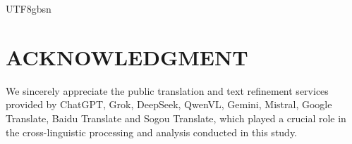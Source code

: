 \documentclass[conference]{IEEEtran}
\begin{document}
\begin{CJK*}{UTF8}{gbsn}




\section*{ACKNOWLEDGMENT}
We sincerely appreciate the public translation and text refinement services provided by ChatGPT, Grok, DeepSeek, QwenVL, Gemini, Mistral, Google Translate, Baidu Translate and Sogou Translate, which played a crucial role in the cross-linguistic processing and analysis conducted in this study.



\end{CJK*}
\end{document}
